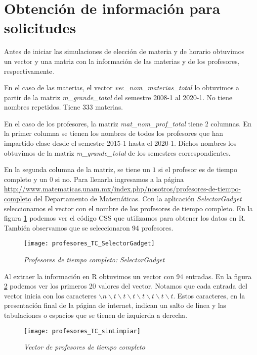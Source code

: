 \section{Obtención de información para solicitudes} \label{InfoSolicitudes}

Antes de iniciar las simulaciones de elección de materia y de horario obtuvimos un vector y una matriz con la información de las materias y de los profesores, respectivamente.

En el caso de las materias, el vector \textit{vec\_nom\_materias\_total} lo obtuvimos a partir de la matriz \textit{m\_grande\_total} del semestre 2008-1 al 2020-1. No tiene nombres repetidos. Tiene 333 materias.

En el caso de los profesores, la matriz \textit{mat\_nom\_prof\_total} tiene 2 columnas. En la primer columna se tienen los nombres de todos los profesores que han impartido clase desde el semestre 2015-1 hasta el 2020-1. Dichos nombres los obtuvimos de la matriz \textit{m\_grande\_total} de los semestres correspondientes.

En la segunda columna de la matriz, se tiene un $1$ si el profesor es de tiempo completo y un $0$ si no. Para llenarla ingresamos a la página \url{http://www.matematicas.unam.mx/index.php/nosotros/profesores-de-tiempo-completo} del Departamento de Matemáticas. Con la aplicación \textit{SelectorGadget} seleccionamos el vector con el nombre de los profesores de tiempo completo. En la figura \ref{profTC_SelectorGadget} podemos ver el código CSS que utilizamos para obtener los datos en R. También observamos que se seleccionaron 94 profesores.

\begin{figure}[H]
\centering
\texttt{[image: profesores\_TC\_SelectorGadget]} %
\caption{\textit{Profesores de tiempo completo: SelectorGadget}}\label{profTC_SelectorGadget}
\end{figure}

Al extraer la información en R obtuvimos un vector con 94 entradas. En la figura \ref{profTC_sinLimpiar} podemos ver los primeros 20 valores del vector. Notamos que cada entrada del vector inicia con los caracteres $\backslash n \backslash t \backslash t \backslash t \backslash t \backslash t \backslash t \backslash t$. Estos caracteres, en la presentación final de la página de internet, indican un salto de línea y las tabulaciones o espacios que se tienen de izquierda a derecha.

\begin{figure}[H]
\centering
\texttt{[image: profesores\_TC\_sinLimpiar]} %
\caption{\textit{Vector de profesores de tiempo completo}}\label{profTC_sinLimpiar}
\end{figure}

